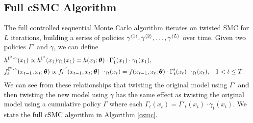 \documentclass[twoside]{article}
\begin{document}
\subsection{Full cSMC Algorithm}
The full controlled sequential Monte Carlo algorithm iterates on twisted SMC for $L$ iterations, building a series of policies $\gamma^{\langle1\rangle}_{}, \gamma^{\langle2\rangle}_{}, \ldots, \gamma^{\langle L\rangle}_{}$  over time.    
Given two policies $\Gamma'$ and $\gamma$, we can define
\begin{align*}
&h^{\Gamma' \cdot \gamma}(x_1) \propto h^{\Gamma'}(x_1) \gamma_1(x_1) = h(x_1; \boldsymbol{\theta}) \cdot {\Gamma'_1}(x_1) \cdot \gamma_1(x_1), & \\ 
& f^{\Gamma' \cdot \gamma}_t(x_{t-1}, x_{t}; \boldsymbol{\theta}) \propto f^{\Gamma'}_t(x_{t-1}, x_t; \boldsymbol{\theta}) \cdot \gamma_t(x_t) = f(x_{t-1}, x_t; \boldsymbol{\theta}) \cdot \Gamma'_t(x_t) \cdot \gamma_t(x_t), & & 1 < t \leq T.
\end{align*}
We can see from these relationships that twisting the original model using $\Gamma'$ and then twisting the new model using $\gamma$ has the same effect as twisting the original model using a cumulative policy $\Gamma$ where each $\Gamma_t(x_t) = \Gamma'_t(x_t) \cdot \gamma_t(x_t)$.  We state the full cSMC algorithm in Algorithm \ref{csmc}.
\end{document}
